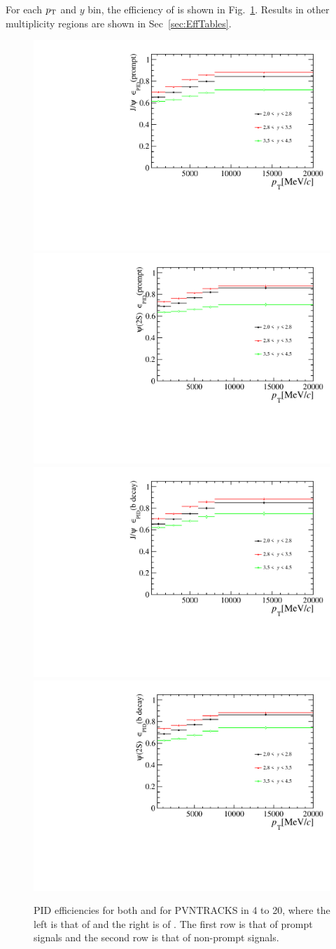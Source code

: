 For each $p_{\mathrm{T}}$ and $y$ bin, the efficiency of \effID is shown in Fig.~\ref{EffID}. Results in other multiplicity regions are shown in Sec~\ref{sec:EffTables}.
\begin{figure}[!tbp]
  \begin{center}
    \includegraphics[width=0.49\linewidth]{pdf/Jpsi/eff_pid/n1_eff_pid_prompt_point.pdf}
    \includegraphics[width=0.49\linewidth]{pdf/Psi2S/eff_pid/n1_eff_pid_prompt_point.pdf}
    \vspace*{-0.5cm}
    \includegraphics[width=0.49\linewidth]{pdf/Jpsi/eff_pid/n1_eff_pid_fromb_point.pdf}
    \includegraphics[width=0.49\linewidth]{pdf/Psi2S/eff_pid/n1_eff_pid_fromb_point.pdf}
  \end{center}
  \caption{
    PID efficiencies for both \jpsi and \psitwos for PVNTRACKS in 4 to 20, where the 
    left is that of \jpsi and the right is of \psitwos. The first row is that of prompt signals and the 
    second row is that of non-prompt signals.}
  \label{EffID}
\end{figure}

